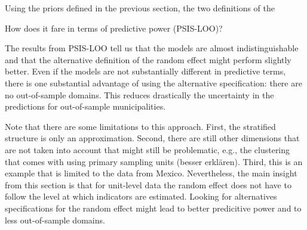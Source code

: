 Using the priors defined in the previous section, the two definitions of the

How does it fare in terms of predictive power (PSIS-LOO)?

The results from PSIS-LOO tell us that the models are almost indistinguishable and that the alternative definition of the random effect might perform slightly better.
Even if the models are not substantially different in predictive terms, there is one substantial advantage of using the alternative specification: there are no out-of-sample domains.
This reduces drastically the uncertainty in the predictions for out-of-sample municipalities.

Note that there are some limitations to this approach.
First, the stratified structure is only an approximation.
Second, there are still other dimensions that are not taken into account that might still be problematic, e.g., the clustering that comes with using primary sampling units (besser erklären).
Third, this is an example that is limited to the data from Mexico.
Nevertheless, the main insight from this section is that for unit-level data the random effect does not have to follow the level at which indicators are estimated.
Looking for alternatives specifications for the random effect might lead to better predicitive power and to less out-of-sample domains.